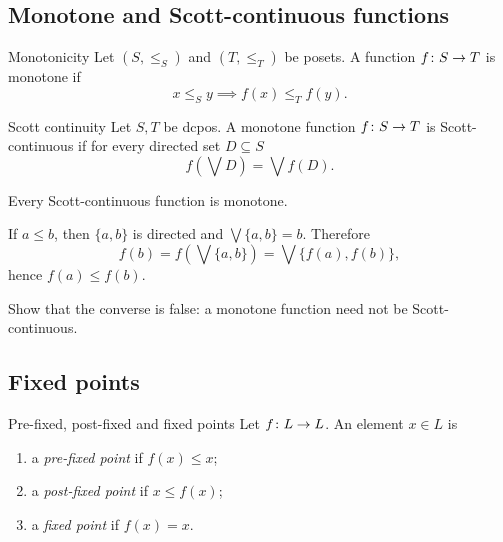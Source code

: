 \documentclass[a4paper]{article}
\begin{document}
\subsection{Monotone and Scott-continuous functions}

\begin{snippetdefinition}{Monotonicity}
    Let \((S,\leq_S)\) and \((T,\leq_T)\) be posets.
    A function \(f\colon S\to T\) is monotone if
    \[
        x\leq_S y
        \implies
        f(x)\leq_T f(y).
    \]
\end{snippetdefinition}

\begin{snippetdefinition}{Scott continuity}
    Let \(S,T\) be dcpos.
    A monotone function \(f\colon S\to T\) is Scott-continuous if for every directed set \(D\subseteq S\)
    \[
        f\left(\bigvee D\right)
        =
        \bigvee f(D).
    \]
\end{snippetdefinition}

\begin{snippetproposition}{}
    Every Scott-continuous function is monotone.
\end{snippetproposition}

\begin{snippetproof}{}
    If \(a\leq b\), then \(\{a,b\}\) is directed and \(\bigvee\{a,b\}=b\).
    Therefore
    \[
        f(b)
        =f(\bigvee\{a,b\})
        =\bigvee\{f(a),f(b)\},
    \]
    hence \(f(a)\leq f(b)\).
\end{snippetproof}

\begin{snippetexercise}{}
    Show that the converse is false: a monotone function need not be Scott-continuous.
\end{snippetexercise}

\subsection{Fixed points}

\begin{snippetdefinition}{Pre-fixed, post-fixed and fixed points}
    Let \(f\colon L\to L\). An element \(x\in L\) is
    \begin{enumerate}
        \item a \emph{pre-fixed point} if \(f(x)\leq x\);
        \item a \emph{post-fixed point} if \(x\leq f(x)\);
        \item a \emph{fixed point} if \(f(x)=x\).
    \end{enumerate}
\end{snippetdefinition}
\end{document}

